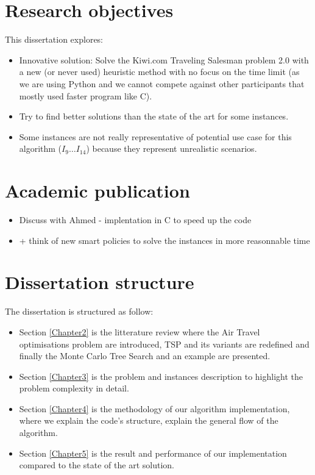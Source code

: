 \section{Research objectives}
\label{section:research_obj}
This dissertation explores:
\begin{itemize}
    \item Innovative solution: Solve the Kiwi.com Traveling Salesman problem 2.0 with a new (or never used) heuristic method with no focus on the time limit (as we are using Python and we cannot compete against other participants that mostly used faster program like C).
    \item Try to find better solutions than the state of the art for some instances.
    \item Some instances are not really representative of potential use case for this algorithm ($I_9 \ldots I_{14}$) because they represent unrealistic scenarios.
\end{itemize}

\section{Academic publication}
\begin{itemize}
    \item Discuss with Ahmed - implentation in C to speed up the code
    \item + think of new smart policies to solve the instances in more reasonnable time
\end{itemize}

\section{Dissertation structure}

The dissertation is structured as follow:
\begin{itemize}
    \item Section \ref{Chapter2} is the litterature review where the Air Travel optimisations problem are introduced, TSP and its variants are redefined and finally the Monte Carlo Tree Search and an example are presented.
    \item Section \ref{Chapter3} is the problem and instances description to highlight the problem complexity in detail.
    \item Section \ref{Chapter4} is the methodology of our algorithm implementation, where we explain the code's structure, explain the general flow of the algorithm.
    \item Section \ref{Chapter5} is the result and performance of our implementation compared to the state of the art solution.
\end{itemize}

